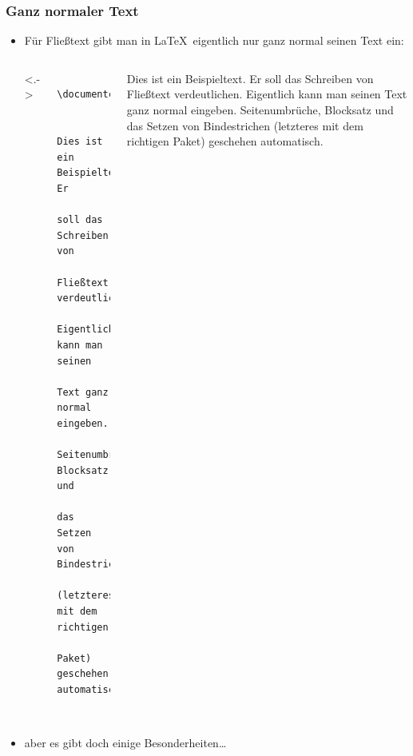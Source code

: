 \begin{frame}[<+->][fragile]
	\frametitle{Ganz normaler Text}
	
	\lstset{frame=L, numbers=left, xleftmargin=0.5cm}
	\begin{itemize}
		\item Für Fließtext gibt man in \LaTeX\ eigentlich nur ganz normal seinen Text ein:
		\begin{columns}<.->
			\begin{lstlisting}
			\documentclass{scrartcl}
			
			Dies ist ein Beispieltext. Er
			soll das Schreiben von
			Fließtext verdeutlichen.
			Eigentlich kann man seinen
			Text ganz normal eingeben.
			Seitenumbrüche, Blocksatz und
			das Setzen von Bindestrichen
			(letzteres mit dem richtigen
			Paket) geschehen automatisch.
			
			\end{lstlisting}
			\justifying\rmfamily
			Dies ist ein Beispieltext. Er
			soll das Schreiben von Fließtext
			verdeutlichen. Eigentlich kann
			man seinen Text ganz normal
			eingeben. Seitenumbrüche,
			Blocksatz und das Setzen von
			Bindestrichen (letzteres mit
			dem richtigen Paket) geschehen
			automatisch.
		\end{columns}
		\item aber es gibt doch einige Besonderheiten\dots
	\end{itemize}
\end{frame}

